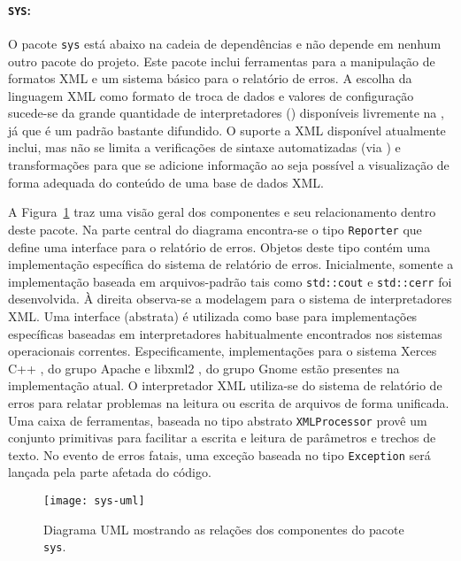 \paragraph{\texttt{SYS}:} O pacote \texttt{sys} está abaixo na cadeia de
dependências e não depende em nenhum outro pacote do projeto. Este pacote
inclui ferramentas para a manipulação de formatos XML e um sistema básico para
o relatório de erros. A escolha da linguagem XML como formato de troca de
dados e valores de configuração sucede-se da grande quantidade de
interpretadores () disponíveis livremente na , já
que é um padrão bastante difundido. O suporte a XML disponível atualmente
inclui, mas não se limita a verificações de sintaxe automatizadas (via
) e transformações para que se adicione informação ao seja
possível a visualização de forma adequada do conteúdo de uma base de dados
XML.

A Figura~\ref{fig:sys-uml} traz uma visão geral dos componentes e seu
relacionamento dentro deste pacote. Na parte central do diagrama encontra-se o
tipo \texttt{Reporter} que define uma interface para o relatório de
erros. Objetos deste tipo contém uma implementação específica do sistema de
relatório de erros. Inicialmente, somente a implementação baseada em
arquivos-padrão tais como \texttt{std::cout} e \texttt{std::cerr}
\cite{web:gcc-stl} foi desenvolvida. À direita observa-se a modelagem para o
sistema de interpretadores XML. Uma interface (abstrata) é utilizada como base
para implementações específicas baseadas em interpretadores habitualmente
encontrados nos sistemas operacionais correntes. Especificamente,
implementações para o sistema Xerces C++ \cite{xerces-c}, do grupo Apache e
libxml2 \cite{libxml2}, do grupo Gnome estão presentes na implementação
atual. O interpretador XML utiliza-se do sistema de relatório de erros para
relatar problemas na leitura ou escrita de arquivos de forma unificada. Uma
caixa de ferramentas, baseada no tipo abstrato \texttt{XMLProcessor} provê um
conjunto primitivas para facilitar a escrita e leitura de parâmetros e trechos
de texto. No evento de erros fatais, uma exceção baseada no tipo
\texttt{Exception} será lançada pela parte afetada do código.

\begin{figure}
\begin{center}
\texttt{[image: sys-uml]}
\end{center}
\caption{Diagrama UML mostrando as relações dos componentes do pacote
\texttt{sys}.}
\label{fig:sys-uml}
\end{figure}

